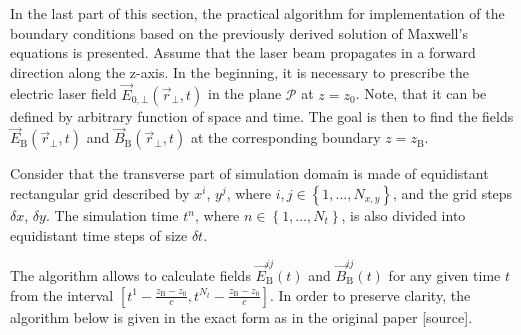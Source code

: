 In the last part of this section, the practical algorithm for implementation of the boundary conditions based on the previously derived solution of Maxwell's equations is presented. Assume that the laser beam propagates in a forward direction along the z-axis. In the beginning, it is necessary to prescribe the electric laser field $ \vec{E}_{0, \bot} (\vec{r}_{\bot}, t) $ in the plane $ \mathcal{P} $ at $ z = z_0 $. Note, that it can be defined by arbitrary function of space and time. The goal is then to find the fields $ \vec{E}_{\mathrm{B}} (\vec{r}_{\bot}, t) $ and $ \vec{B}_{\mathrm{B}} (\vec{r}_{\bot}, t) $ at the corresponding boundary $ z = z_\mathrm{B} $.

Consider that the transverse part of simulation domain is made of equidistant rectangular grid described by $ x^{i} $, $ y^{j} $, where $ i, j \in \left\lbrace 1, \ldots, N_{x, y} \right\rbrace $, and the grid steps $ \delta x $, $\delta y $. The simulation time $ t^{n} $, where $ n \in \left\lbrace 1, \ldots, N_{t} \right\rbrace $, is also divided into equidistant time steps of size $ \delta t $.

The algorithm allows to calculate fields $ \vec{E}_{\mathrm{B}}^{ij} (t) $ and $ \vec{B}_{\mathrm{B}}^{ij} (t) $ for any given time $ t $ from the interval $ \left[ t^{1} - \frac{z_\mathrm{B} - z_0}{c}, t^{N_t} - \frac{z_\mathrm{B} - z_0}{c} \right] $. In order to preserve clarity, the algorithm below is given in the exact form as in the original paper [source].

